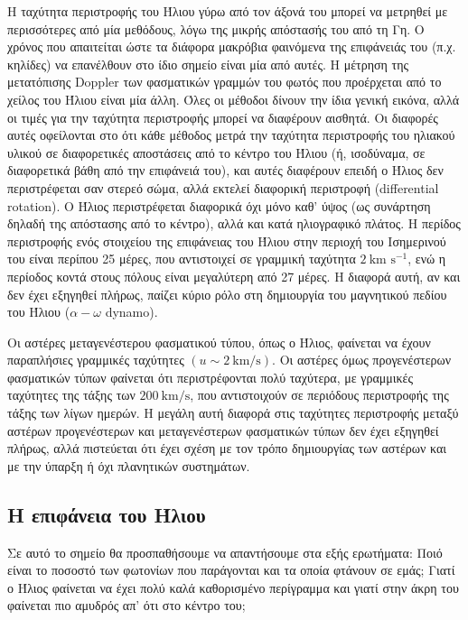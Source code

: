 Η ταχύτητα περιστροφής του Ήλιου γύρω από τον άξονά του μπορεί να μετρηθεί με περισσότερες από μία μεθόδους, λόγω της μικρής απόστασής του από τη Γη. Ο χρόνος που απαιτείται ώστε τα διάφορα μακρόβια φαινόμενα της επιφάνειάς του (π.χ. κηλίδες) να επανέλθουν στο ίδιο σημείο είναι μία από αυτές. Η μέτρηση της μετατόπισης Doppler των φασματικών γραμμών του φωτός που προέρχεται από το χείλος του Ήλιου είναι μία άλλη. Όλες οι μέθοδοι δίνουν την ίδια γενική εικόνα, αλλά οι τιμές για την ταχύτητα περιστροφής μπορεί να διαφέρουν αισθητά. Οι διαφορές αυτές οφείλονται στο ότι κάθε μέθοδος μετρά την ταχύτητα περιστροφής του ηλιακού υλικού σε διαφορετικές αποστάσεις από το κέντρο του Ήλιου (ή, ισοδύναμα, σε διαφορετικά βάθη από την επιφάνειά του), και αυτές διαφέρουν επειδή ο Ήλιος δεν περιστρέφεται σαν στερεό σώμα, αλλά εκτελεί διαφορική περιστροφή (differential rotation). Ο Ήλιος περιστρέφεται διαφορικά όχι μόνο καθ' ύψος (ως συνάρτηση δηλαδή της απόστασης από το κέντρο), αλλά και κατά ηλιογραφικό πλάτος. Η περίδος περιστροφής ενός στοιχείου της επιφάνειας του Ήλιου στην περιοχή του Ισημερινού του είναι περίπου 25 μέρες, που αντιστοιχεί σε γραμμική ταχύτητα $2 \ \text{km s$^{-1}$}$, ενώ η περίοδος κοντά στους πόλους είναι μεγαλύτερη από 27 μέρες. Η διαφορά αυτή, αν και δεν έχει εξηγηθεί πλήρως, παίζει κύριο ρόλο στη δημιουργία του μαγνητικού πεδίου του Ήλιου ($\alpha - \omega $ dynamo).

Οι αστέρες μεταγενέστερου φασματικού τύπου, όπως ο Ήλιος, φαίνεται να έχουν παραπλήσιες γραμμικές ταχύτητες $(u \sim 2 \ \text{km/s})$. Οι αστέρες όμως προγενέστερων φασματικών τύπων φαίνεται ότι περιστρέφονται πολύ ταχύτερα, με γραμμικές ταχύτητες της τάξης των $200 \ \text{km/s}$, που αντιστοιχούν σε περιόδους περιστροφής της τάξης των λίγων ημερών. Η μεγάλη αυτή διαφορά στις ταχύτητες περιστροφής μεταξύ αστέρων προγενέστερων και μεταγενέστερων φασματικών τύπων δεν έχει εξηγηθεί πλήρως, αλλά πιστεύεται ότι έχει σχέση με τον τρόπο δημιουργίας των αστέρων και με την ύπαρξη ή όχι πλανητικών συστημάτων.


\newpage
\subsection{Η επιφάνεια του Ήλιου}
Σε αυτό το σημείο θα προσπαθήσουμε να απαντήσουμε στα εξής ερωτήματα: Ποιό είναι το ποσοστό των φωτονίων που παράγονται και τα οποία φτάνουν σε εμάς; Γιατί ο Ήλιος φαίνεται να έχει πολύ καλά καθορισμένο περίγραμμα και γιατί στην άκρη του φαίνεται πιο αμυδρός απ' ότι στο κέντρο του;

